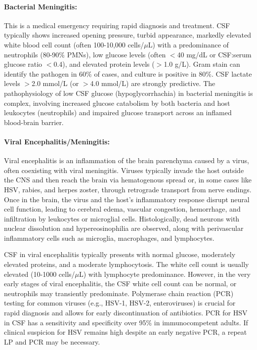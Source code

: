 	\paragraph{Bacterial Meningitis:} This is a medical emergency requiring rapid diagnosis and treatment. CSF typically shows increased opening pressure, turbid appearance, markedly elevated white blood cell count (often 100-10,000 cells/$\mu$L) with a predominance of neutrophils (80-90\% PMNs), low glucose levels (often $<$40 mg/dL or CSF:serum glucose ratio $<$0.4), and elevated protein levels ($>$1.0 g/L). Gram stain can identify the pathogen in 60\% of cases, and culture is positive in 80\%. CSF lactate levels $>$2.0 mmol/L (or $>$4.0 mmol/L) are strongly predictive. The pathophysiology of low CSF glucose (hypoglycorrhachia) in bacterial meningitis is complex, involving increased glucose catabolism by both bacteria and host leukocytes (neutrophils) and impaired glucose transport across an inflamed blood-brain barrier.
	
	\paragraph{Viral Encephalitis/Meningitis:} Viral encephalitis is an inflammation of the brain parenchyma caused by a virus, often coexisting with viral meningitis. Viruses typically invade the host outside the CNS and then reach the brain via hematogenous spread or, in some cases like HSV, rabies, and herpes zoster, through retrograde transport from nerve endings. Once in the brain, the virus and the host's inflammatory response disrupt neural cell function, leading to cerebral edema, vascular congestion, hemorrhage, and infiltration by leukocytes or microglial cells. Histologically, dead neurons with nuclear dissolution and hypereosinophilia are observed, along with perivascular inflammatory cells such as microglia, macrophages, and lymphocytes.
	
	CSF in viral encephalitis typically presents with normal glucose, moderately elevated proteins, and a moderate lymphocytosis. The white cell count is usually elevated (10-1000 cells/$\mu$L) with lymphocyte predominance. However, in the very early stages of viral encephalitis, the CSF white cell count can be normal, or neutrophils may transiently predominate. Polymerase chain reaction (PCR) testing for common viruses (e.g., HSV-1, HSV-2, enteroviruses) is crucial for rapid diagnosis and allows for early discontinuation of antibiotics. PCR for HSV in CSF has a sensitivity and specificity over 95\% in immunocompetent adults. If clinical suspicion for HSV remains high despite an early negative PCR, a repeat LP and PCR may be necessary.
	
